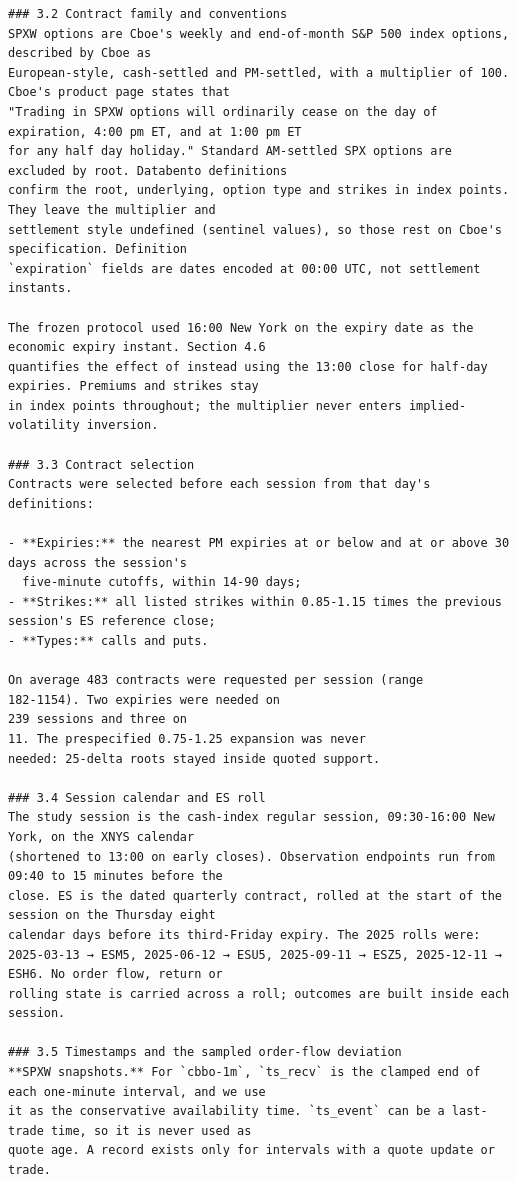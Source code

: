 \documentclass[11pt]{article}
\begin{document}
\begin{verbatim}
### 3.2 Contract family and conventions
SPXW options are Cboe's weekly and end-of-month S&P 500 index options, described by Cboe as
European-style, cash-settled and PM-settled, with a multiplier of 100. Cboe's product page states that
"Trading in SPXW options will ordinarily cease on the day of expiration, 4:00 pm ET, and at 1:00 pm ET
for any half day holiday." Standard AM-settled SPX options are excluded by root. Databento definitions
confirm the root, underlying, option type and strikes in index points. They leave the multiplier and
settlement style undefined (sentinel values), so those rest on Cboe's specification. Definition
`expiration` fields are dates encoded at 00:00 UTC, not settlement instants.

The frozen protocol used 16:00 New York on the expiry date as the economic expiry instant. Section 4.6
quantifies the effect of instead using the 13:00 close for half-day expiries. Premiums and strikes stay
in index points throughout; the multiplier never enters implied-volatility inversion.

### 3.3 Contract selection
Contracts were selected before each session from that day's definitions:

- **Expiries:** the nearest PM expiries at or below and at or above 30 days across the session's
  five-minute cutoffs, within 14-90 days;
- **Strikes:** all listed strikes within 0.85-1.15 times the previous session's ES reference close;
- **Types:** calls and puts.

On average 483 contracts were requested per session (range
182-1154). Two expiries were needed on
239 sessions and three on
11. The prespecified 0.75-1.25 expansion was never
needed: 25-delta roots stayed inside quoted support.

### 3.4 Session calendar and ES roll
The study session is the cash-index regular session, 09:30-16:00 New York, on the XNYS calendar
(shortened to 13:00 on early closes). Observation endpoints run from 09:40 to 15 minutes before the
close. ES is the dated quarterly contract, rolled at the start of the session on the Thursday eight
calendar days before its third-Friday expiry. The 2025 rolls were: 2025-03-13 → ESM5, 2025-06-12 → ESU5, 2025-09-11 → ESZ5, 2025-12-11 → ESH6. No order flow, return or
rolling state is carried across a roll; outcomes are built inside each session.

### 3.5 Timestamps and the sampled order-flow deviation
**SPXW snapshots.** For `cbbo-1m`, `ts_recv` is the clamped end of each one-minute interval, and we use
it as the conservative availability time. `ts_event` can be a last-trade time, so it is never used as
quote age. A record exists only for intervals with a quote update or trade.


\end{verbatim}
\end{document}
